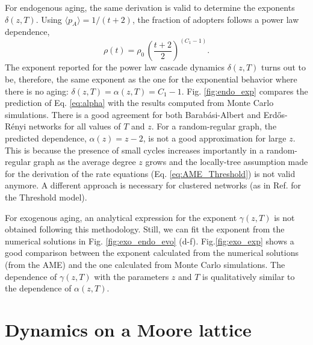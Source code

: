 For endogenous aging, the same derivation is valid to determine the exponents $\delta(z,T)$. Using $\langle p_A \rangle = 1/(t+2)$, the fraction of adopters follows a power law dependence,
\begin{equation}
    \label{rho_endo}
    \rho(t) = \rho_0 \, \left( \frac{t+2}{2} \right)^{(C_1 - 1)}.
\end{equation}
The exponent reported for the power law cascade dynamics $\delta(z,T)$ turns out to be, therefore, the same exponent as the one for the exponential behavior where there is no aging:  $\delta(z,T)= \alpha(z,T)= C_{1} - 1$. Fig. \ref{fig:endo_exp} compares the prediction of Eq. \eqref{eq:alpha} with the results computed from Monte Carlo simulations. There is a good agreement for both Barab\'asi-Albert and Erd\H{o}s-R\'enyi networks for all values of $T$ and $z$. For a random-regular graph, the predicted dependence, $\alpha(z) = z - 2$, is not a good approximation for large $z$. This is because the presence of small cycles increases importantly in a random-regular graph as the average degree $z$ grows \cite{wormald_1999} and the locally-tree assumption made for the derivation of the rate equations (Eq. \eqref{eq:AME_Threshold}) is not valid anymore. A different approach is necessary for clustered networks (as in Ref.\cite{Leah2022} for the Threshold model).

For exogenous aging, an analytical expression for the exponent $\gamma(z,T)$ is not obtained following this methodology. Still, we can fit the exponent from the numerical solutions in Fig. \ref{fig:exo_endo_evo} (d-f). Fig.\ref{fig:exo_exp} shows a good comparison between the exponent calculated from the numerical solutions (from the AME) and the one calculated from  Monte Carlo simulations. The dependence of $\gamma(z,T)$ with the parameters $z$ and $T$ is qualitatively similar to the dependence of  $\alpha(z,T)$.

\section{\label{sec:Lattice} Dynamics on a Moore lattice}

